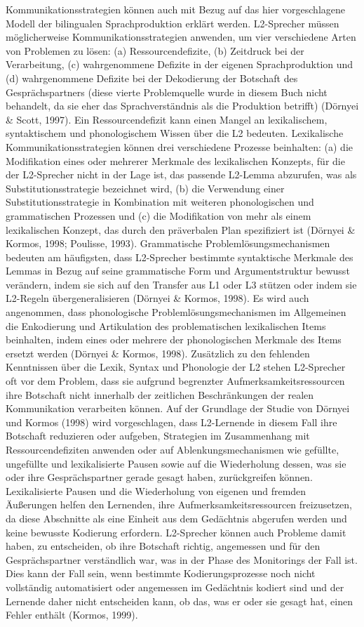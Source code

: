 \documentclass[
  letterpaper,
]{scrbook}
\begin{document}
Kommunikationsstrategien können auch mit Bezug auf das hier
vorgeschlagene Modell der bilingualen Sprachproduktion erklärt werden.
L2-Sprecher müssen möglicherweise Kommunikationsstrategien anwenden, um
vier verschiedene Arten von Problemen zu lösen: (a) Ressourcendefizite,
(b) Zeitdruck bei der Verarbeitung, (c) wahrgenommene Defizite in der
eigenen Sprachproduktion und (d) wahrgenommene Defizite bei der
Dekodierung der Botschaft des Gesprächspartners (diese vierte
Problemquelle wurde in diesem Buch nicht behandelt, da sie eher das
Sprachverständnis als die Produktion betrifft) (Dörnyei \& Scott, 1997).
Ein Ressourcendefizit kann einen Mangel an lexikalischem, syntaktischem
und phonologischem Wissen über die L2 bedeuten. Lexikalische
Kommunikationsstrategien können drei verschiedene Prozesse beinhalten:
(a) die Modifikation eines oder mehrerer Merkmale des lexikalischen
Konzepts, für die der L2-Sprecher nicht in der Lage ist, das passende
L2-Lemma abzurufen, was als Substitutionsstrategie bezeichnet wird, (b)
die Verwendung einer Substitutionsstrategie in Kombination mit weiteren
phonologischen und grammatischen Prozessen und (c) die Modifikation von
mehr als einem lexikalischen Konzept, das durch den präverbalen Plan
spezifiziert ist (Dörnyei \& Kormos, 1998; Poulisse, 1993). Grammatische
Problemlösungsmechanismen bedeuten am häufigsten, dass L2-Sprecher
bestimmte syntaktische Merkmale des Lemmas in Bezug auf seine
grammatische Form und Argumentstruktur bewusst verändern, indem sie sich
auf den Transfer aus L1 oder L3 stützen oder indem sie L2-Regeln
übergeneralisieren (Dörnyei \& Kormos, 1998). Es wird auch angenommen,
dass phonologische Problemlösungsmechanismen im Allgemeinen die
Enkodierung und Artikulation des problematischen lexikalischen Items
beinhalten, indem eines oder mehrere der phonologischen Merkmale des
Items ersetzt werden (Dörnyei \& Kormos, 1998). Zusätzlich zu den
fehlenden Kenntnissen über die Lexik, Syntax und Phonologie der L2
stehen L2-Sprecher oft vor dem Problem, dass sie aufgrund begrenzter
Aufmerksamkeitsressourcen ihre Botschaft nicht innerhalb der zeitlichen
Beschränkungen der realen Kommunikation verarbeiten können. Auf der
Grundlage der Studie von Dörnyei und Kormos (1998) wird vorgeschlagen,
dass L2-Lernende in diesem Fall ihre Botschaft reduzieren oder aufgeben,
Strategien im Zusammenhang mit Ressourcendefiziten anwenden oder auf
Ablenkungsmechanismen wie gefüllte, ungefüllte und lexikalisierte Pausen
sowie auf die Wiederholung dessen, was sie oder ihre Gesprächspartner
gerade gesagt haben, zurückgreifen können. Lexikalisierte Pausen und die
Wiederholung von eigenen und fremden Äußerungen helfen den Lernenden,
ihre Aufmerksamkeitsressourcen freizusetzen, da diese Abschnitte als
eine Einheit aus dem Gedächtnis abgerufen werden und keine bewusste
Kodierung erfordern. L2-Sprecher können auch Probleme damit haben, zu
entscheiden, ob ihre Botschaft richtig, angemessen und für den
Gesprächspartner verständlich war, was in der Phase des Monitorings der
Fall ist. Dies kann der Fall sein, wenn bestimmte Kodierungsprozesse
noch nicht vollständig automatisiert oder angemessen im Gedächtnis
kodiert sind und der Lernende daher nicht entscheiden kann, ob das, was
er oder sie gesagt hat, einen Fehler enthält (Kormos, 1999).
\end{document}

